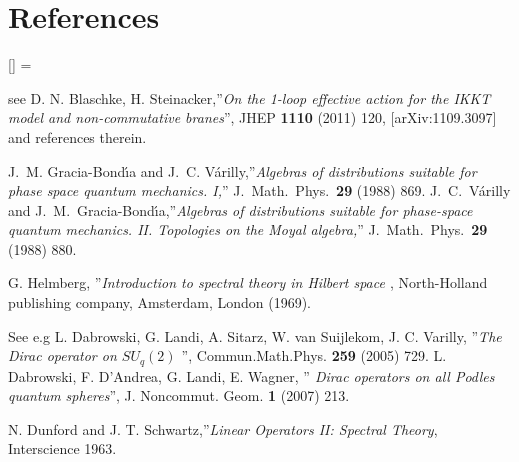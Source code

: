 \documentclass[a4paper]{jpconf}
\numberwithin{equation}{section}
\theoremstyle{nonumberplain}
\renewenvironment{thebibliography}[1]{%
\section*{References}%
\frenchspacing\small%
\begin{list}{[\arabic{enumi}]}%
{%
\usecounter{enumi}\parsep=2pt\topsep 0pt%
\settowidth{\labelwidth}{[#1]}%
\leftmargin=\labelwidth\advance\leftmargin\labelsep%
\rightmargin=0pt\itemsep=1pt\sloppy%
}%
}{\end{list}}
\begin{document}
\begin{thebibliography}{50}
 see D. N. Blaschke, H. Steinacker,''{\it{On the 1-loop effective action for the IKKT model and non-commutative branes}}'', JHEP {\bf{1110}} (2011) 120, [arXiv:1109.3097] and references therein.

  J.~M. Gracia-Bond{\'\i}a and J.~C.
  V{\'a}rilly,''{\it{Algebras of distributions suitable for phase space
  quantum mechanics. {I},}}'' J.\ Math.\ Phys.\ {\bf 29} (1988) 869. J.~C.~V{\'a}rilly and J.~M.~Gracia-Bond{\'\i}a,''{\it{Algebras of distributions suitable for phase-space
quantum mechanics. {II}.
  Topologies on the Moyal algebra,}}''
  J.\ Math.\ Phys.\  {\bf 29} (1988) 880.

 G. Helmberg, ''{\it{Introduction to spectral theory in Hilbert space }}, North-Holland publishing company, Amsterdam, London (1969).

 See e.g
L. Dabrowski, G. Landi, A. Sitarz, W. van Suijlekom, J. C. Varilly, ''{\it{The Dirac operator on $SU_q(2)$ }}'', Commun.Math.Phys. {\bf{259}} (2005) 729. L. Dabrowski, F. D'Andrea, G. Landi, E. Wagner, ''{\it{ Dirac operators on all Podles quantum spheres}}'', J. Noncommut. Geom. {\bf{1}} (2007) 213.

 N. Dunford and J. T. Schwartz,''{\it{Linear Operators II: Spectral Theory}}, Interscience 1963.

\end{thebibliography}

\end{document}
